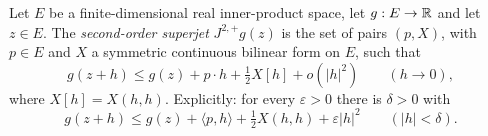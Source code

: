 \begin{definition}
Let $E$ be a finite-dimensional real inner-product space, let $g:E\to\mathbb{R}$ and let
$z\in E$. The \emph{second-order superjet} $J^{2,+}g(z)$ is the set of pairs
$(p,X)$, with $p\in E$ and $X$ a symmetric continuous bilinear form on $E$, such
that
\[
  g(z+h)\le g(z)+p\cdot h+\tfrac12X[h]+o(|h|^2)
  \qquad(h\to0),
\]
where $X[h]=X(h,h)$. Explicitly: for every $\varepsilon>0$ there is $\delta>0$
with
\[
  g(z+h)\le g(z)+\langle p,h\rangle+\tfrac12X(h,h)+\varepsilon|h|^2
  \qquad(|h|<\delta).
\]
\end{definition}
